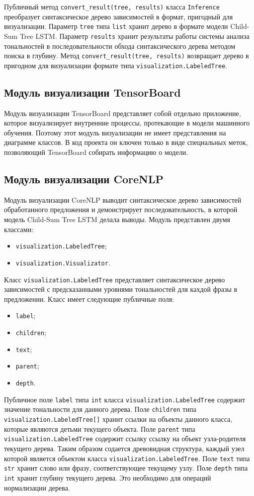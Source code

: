 Публичный метод \texttt{convert\_result(tree, results)} класса \texttt{Inference} преобразует синтаксическое дерево зависимостей в формат, пригодный для визуализации. Параметр \texttt{tree} типа \texttt{list} хранит дерево в формате модели Child-Sum Tree LSTM\@. Параметр \texttt{results} хранит результаты работы системы анализа тональностей в последовательности обхода синтаксического дерева методом поиска в глубину. Метод \texttt{convert\_result(tree, results)} возвращает дерево в пригодном для визуализации формате типа \texttt{visualization.La\-beledTree}.

\subsection{Модуль визуализации TensorBoard}
Модуль визуализации TensorBoard представляет собой отдельно приложение, которое визуализирует внутренние процессы, протекающие в модели машинного обучения. Поэтому этот модуль визуализации не имеет представления на диаграмме классов. В код проекта он ключен только в виде специальных меток, позволяющий TensorBoard собирать информацию о модели.

\subsection{Модуль визуализации CoreNLP}
Модуль визуализации CoreNLP выводит синтаксическое дерево зависимостей обработанного предложения и демонстрирует последовательность, в которой модель Child-Sum Tree LSTM делала выводы. Модуль представлен двумя классами:
\begin{itemize}
\item \texttt{visualization.LabeledTree};
\item \texttt{visualization.Visualizator}.
\end{itemize}

Класс \texttt{visualization.LabeledTree} представляет синтаксическое дерево зависимостей с предсказанными уровнями тональностей для кахдой фразы в предложении. Класс имеет следующие публичные поля:
\begin{itemize}
\item \texttt{label};
\item \texttt{children};
\item \texttt{text};
\item \texttt{parent};
\item \texttt{depth}.
\end{itemize}

Публичное поле \texttt{label} типа \texttt{int} класса \texttt{visualization.LabeledTree} содержит значение тональности для данного дерева. Поле \texttt{children} типа \texttt{vi\-sualization.LabeledTree[]} хранит ссылки на объекты данного класса, которые являются детьми текущего объекта. Поле \texttt{parent} типа \texttt{visualizati\-on.LabeledTree} содержит ссылку ссылку на объект узла-родителя текущего дерева. Таким образом содается древовидная структура, каждый узел которой является объектом класса \texttt{visualization.LabeledTree}. Поле \texttt{text} типа \texttt{str} хранит слово или фразу, соответствующее текущему узлу. Поле \texttt{depth} типа \texttt{int} хранит глубину текущего дерева. Это необходимо для операций нормализации дерева.

